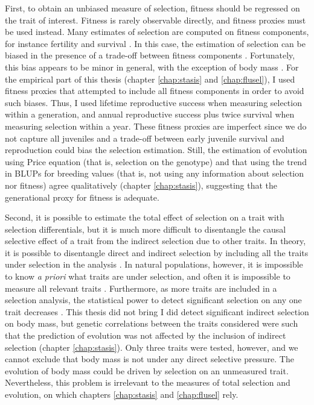 First, to obtain an unbiased measure of selection, fitness should be regressed on the trait of interest. Fitness is rarely observable directly, and fitness proxies must be used instead. Many estimates of selection are computed on fitness components, for instance fertility and survival \parencite{Kingsolver2012}. In this case, the estimation of selection can be biased in the presence of a trade-off between fitness components \parencite{Thompson2011, Kingsolver2012, Brookfield2016}. Fortunately, this bias appears to be minor in general, with the exception of body mass \parencite{Kingsolver2011}.
For the empirical part of this thesis (chapter \ref{chap:stasis} and \ref{chap:flusel}), I used fitness proxies that attempted to include all fitness components in order to avoid such biases. Thus, I used lifetime reproductive success when measuring selection within a generation, and annual reproductive success plus twice survival when measuring selection within a year. These fitness proxies are imperfect since we do not capture all juveniles and a trade-off between early juvenile survival and reproduction could bias the selection estimation. Still, the estimation of evolution using Price equation (that is, selection on the genotype) and that using the trend in BLUPs for breeding values (that is, not using any information about selection nor fitness) agree qualitatively (chapter \ref{chap:stasis}), suggesting that the generational proxy for fitness is adequate. 

Second, it is possible to estimate the total effect of selection on a trait with selection differentials, but it is much more difficult to disentangle the causal selective effect of a trait from the indirect selection due to other traits. In theory, it is possible to disentangle direct and indirect selection by including all the traits under selection in the analysis \parencite{Lande1983}. In natural populations, however, it is impossible to know \emph{a priori} what traits are under selection, and often it is impossible to measure all relevant traits \parencite{Brookfield2016, Hadfield2008}. Furthermore, as more traits are included in a selection analysis, the statistical power to detect significant selection on any one trait decreases \parencite{Mitchell-Olds1987}. This thesis did not bring 
I did detect significant indirect selection on body mass, but genetic correlations between the traits considered were such that the prediction of evolution was not affected by the inclusion of indirect selection (chapter \ref{chap:stasis}). Only three traits were tested, however, and we cannot exclude that body mass is not under any direct selective pressure. The evolution of body mass could be driven by selection on an unmeasured trait.
Nevertheless, this problem is irrelevant to the measures of total selection and evolution, on which chapters \ref{chap:stasis} and \ref{chap:flusel} rely.

